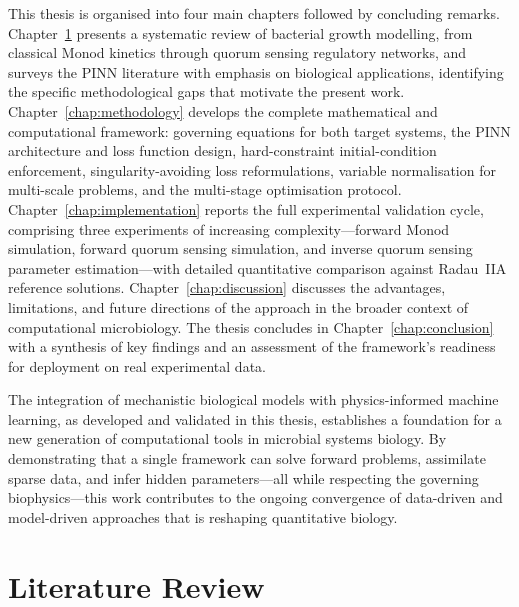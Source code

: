 \documentclass[14pt,a4paper,openany]{extbook}
\begin{document}
This thesis is organised into four main chapters followed by concluding remarks. Chapter~\ref{chap:litreview} presents a systematic review of bacterial growth modelling, from classical Monod kinetics through quorum sensing regulatory networks, and surveys the PINN literature with emphasis on biological applications, identifying the specific methodological gaps that motivate the present work. Chapter~\ref{chap:methodology} develops the complete mathematical and computational framework: governing equations for both target systems, the PINN architecture and loss function design, hard-constraint initial-condition enforcement, singularity-avoiding loss reformulations, variable normalisation for multi-scale problems, and the multi-stage optimisation protocol. Chapter~\ref{chap:implementation} reports the full experimental validation cycle, comprising three experiments of increasing complexity---forward Monod simulation, forward quorum sensing simulation, and inverse quorum sensing parameter estimation---with detailed quantitative comparison against Radau~IIA reference solutions. Chapter~\ref{chap:discussion} discusses the advantages, limitations, and future directions of the approach in the broader context of computational microbiology. The thesis concludes in Chapter~\ref{chap:conclusion} with a synthesis of key findings and an assessment of the framework's readiness for deployment on real experimental data.

The integration of mechanistic biological models with physics-informed machine learning, as developed and validated in this thesis, establishes a foundation for a new generation of computational tools in microbial systems biology. By demonstrating that a single framework can solve forward problems, assimilate sparse data, and infer hidden parameters---all while respecting the governing biophysics---this work contributes to the ongoing convergence of data-driven and model-driven approaches that is reshaping quantitative biology.

\chapter{Literature Review}
\label{chap:litreview}
\end{document}
